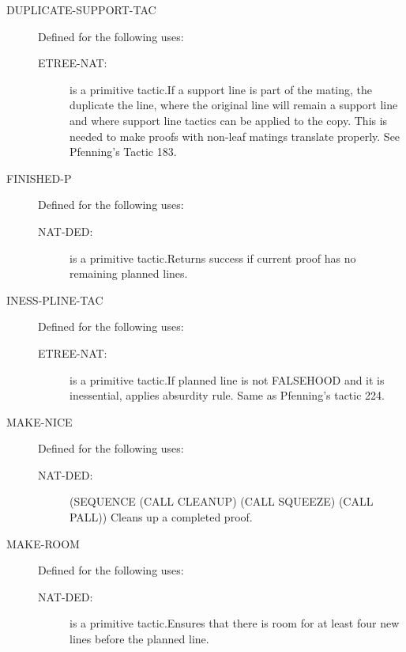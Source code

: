 \begin{description} 
\item[DUPLICATE-SUPPORT-TAC]  Defined for the following uses:
\begin{description}
\item[ETREE-NAT:]  is a primitive tactic.If a support line is part of the mating, the duplicate the
line, where the original line will remain a support line and
where support line tactics can be applied to the copy.
This is needed to make proofs with non-leaf matings translate properly.
See Pfenning's Tactic 183.

\end{description}

\item[FINISHED-P]  Defined for the following uses:
\begin{description}
\item[NAT-DED:]  is a primitive tactic.Returns success if current proof has no remaining planned lines.

\end{description}

\item[INESS-PLINE-TAC]  Defined for the following uses:
\begin{description}
\item[ETREE-NAT:]  is a primitive tactic.If planned line is not FALSEHOOD and it is inessential, applies
absurdity rule.  Same as Pfenning's tactic 224.

\end{description}

\item[MAKE-NICE]  Defined for the following uses:
\begin{description}
\item[NAT-DED:] 
(SEQUENCE (CALL CLEANUP) (CALL SQUEEZE) (CALL PALL))
Cleans up a completed proof.

\end{description}

\item[MAKE-ROOM]  Defined for the following uses:
\begin{description}
\item[NAT-DED:]  is a primitive tactic.Ensures that there is room for at least four new lines before
the planned line.


\end{description}
\end{description}
